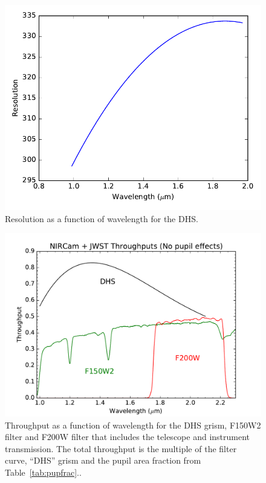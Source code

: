 \documentclass[iop]{emulateapj}
\begin{document}
\begin{figure}[!b]
\centering
\includegraphics[width=1.0\columnwidth]{dhs_res.pdf}
\caption{Resolution as a function of wavelength for the DHS.}\label{fig:DHSRes}
\end{figure}

\begin{figure}[!b]
\centering
\includegraphics[width=1.0\columnwidth]{NIRCam+OTE_SWA_DHS_and_F150W2_efficiency.pdf}
\caption{Throughput as a function of wavelength for the DHS grism, F150W2 filter and F200W filter that includes the telescope and instrument transmission. The total throughput is the multiple of the filter curve, ``DHS'' grism and the pupil area fraction from Table~\ref{tab:pupfrac}..}\label{fig:DHSthrough}
\end{figure}
\end{document}
